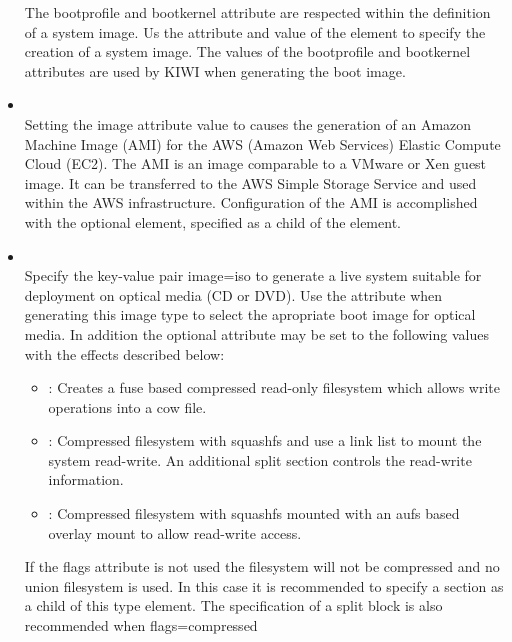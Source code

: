 \begin{itemize}
      The bootprofile and bootkernel attribute are respected within the 
      definition of a system image. Us the attribute and value 
       of the  element to specify the
      creation of a system image. The values of the bootprofile and 
      bootkernel attributes are used by KIWI when generating the boot image.
\item {}\\
      Setting the image attribute value to  causes the generation of
      an Amazon Machine Image (AMI) for the AWS (Amazon Web Services) 
      Elastic Compute Cloud (EC2). The AMI is an image comparable to
      a VMware or Xen guest image. It can be transferred to the AWS 
      Simple Storage Service and used within the AWS infrastructure.
      Configuration of the AMI is accomplished with the optional
       element, specified as a child of the 
      element.
\item {}\\
      Specify the key-value pair image=iso to generate a live system suitable
      for deployment on optical media (CD or DVD). Use the 
       attribute when generating this image
      type to select the apropriate boot image for optical media. In 
      addition the optional  attribute may be set to the
      following values with the effects described below:
      \begin{itemize}
      \item {}: Creates a fuse based compressed read-only
            filesystem which allows write operations into a cow file.
      \item {}: Compressed filesystem with squashfs and
            use a link list to mount the system read-write. An additional
            split section controls the read-write information.
      \item {}: Compressed filesystem with squashfs mounted
            with an aufs based overlay mount to allow read-write access.
      \end{itemize}
      If the flags attribute is not used the filesystem will not be compressed
      and no union filesystem is used. In this case it is recommended to
      specify a  section as a child of this type element. The
      specification of a split block is also recommended when flags=compressed

\end{itemize}

